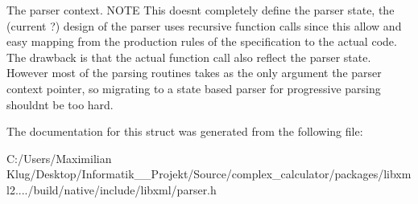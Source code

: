 The parser context. N\+O\+TE This doesn\textquotesingle{}t completely define the parser state, the (current ?) design of the parser uses recursive function calls since this allow and easy mapping from the production rules of the specification to the actual code. The drawback is that the actual function call also reflect the parser state. However most of the parsing routines takes as the only argument the parser context pointer, so migrating to a state based parser for progressive parsing shouldn\textquotesingle{}t be too hard. 

The documentation for this struct was generated from the following file\+:\begin{DoxyCompactItemize}
\item 
C\+:/\+Users/\+Maximilian Klug/\+Desktop/\+Informatik\+\_\+\_\+\+Projekt/\+Source/complex\+\_\+calculator/packages/libxml2..../build/native/include/libxml/parser.\+h\end{DoxyCompactItemize}
